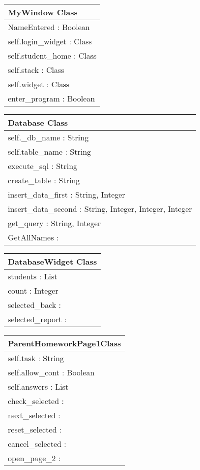 \begin{center}
\begin{tabular}{|p{7cm}|} \hline
\textbf{MyWindow Class} \\ \hline
NameEntered : Boolean \\
self.login\_widget : Class \\
self.student\_home : Class \\
self.stack : Class \\
self.widget : Class \\ \hline
enter\_program : Boolean \\ \hline
\end{tabular}
\end{center}

\begin{center}
\begin{tabular}{|p{7cm}|} \hline
\textbf{Database Class} \\ \hline
self.\_db\_name : String \\
self.table\_name : String \\ \hline
execute\_sql : String \\
create\_table : String \\
insert\_data\_first : String, Integer \\
insert\_data\_second : String, Integer, Integer, Integer \\
get\_query : String, Integer \\
GetAllNames : \\ \hline
\end{tabular}
\end{center}

\begin{center}
\begin{tabular}{|p{7cm}|} \hline
\textbf{DatabaseWidget Class} \\ \hline
students : List \\
count : Integer \\ \hline
selected\_back : \\
selected\_report : \\ \hline
\end{tabular}
\end{center}

\begin{center}
\begin{tabular}{|p{7cm}|} \hline
\textbf{ParentHomeworkPage1Class} \\ \hline
self.task : String \\
self.allow\_cont : Boolean \\
self.answers : List \\ \hline
check\_selected : \\
next\_selected : \\
reset\_selected : \\
cancel\_selected : \\
open\_page\_2 : \\ \hline
\end{tabular}
\end{center}

